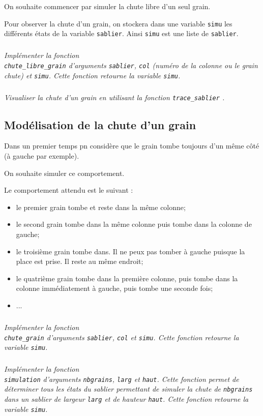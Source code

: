 \begin{obj}
On souhaite commencer par simuler la chute libre d'un seul grain.
\end{obj}

Pour observer la chute d'un grain, on stockera dans une variable \texttt{simu} les différents états de la variable \texttt{sablier}. Ainsi \texttt{simu} est une liste de \texttt{sablier}.

\subparagraph{}\textit{Implémenter la fonction \\ \texttt{chute\_libre\_grain} d'arguments \texttt{sablier}, \texttt{col} (numéro de la colonne ou le grain chute) et \texttt{simu}. Cette fonction retourne la variable \texttt{simu}. }


\subparagraph{}\textit{Visualiser la chute d'un grain en utilisant la fonction \texttt{trace\_sablier} . }

\subsection*{Modélisation de la chute d'un grain}
\begin{obj}
Dans un premier temps pn considère que le grain tombe toujours d'un même côté (à gauche par exemple). 

On souhaite simuler ce comportement. 
\end{obj}


Le comportement attendu est le suivant : 
\begin{itemize}
\item le premier grain tombe et reste dans la même colonne;
\item le second grain tombe dans la même colonne puis tombe dans la colonne de gauche;
\item le troisième grain tombe dans. Il ne peux pas tomber à gauche puisque la place est prise. Il reste au même endroit;
\item le quatrième grain tombe dans la première colonne, puis tombe dans la colonne immédiatement à gauche, puis tombe une seconde fois;
\item ...
\end{itemize}


\subparagraph{}\textit{Implémenter la fonction \\ \texttt{chute\_grain} d'arguments \texttt{sablier}, \texttt{col} et \texttt{simu}. Cette fonction retourne la variable \texttt{simu}. }


\subparagraph{}\textit{Implémenter la fonction \\ \texttt{simulation} d'arguments \texttt{nbgrains}, \texttt{larg} et \texttt{haut}. Cette fonction permet de déterminer tous les états du sablier permettant de simuler la chute de \texttt{nbgrains} dans un sablier de largeur \texttt{larg} et de hauteur \texttt{haut}. Cette fonction retourne la variable \texttt{simu}. }

